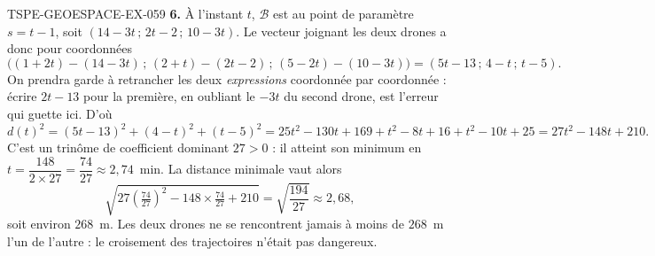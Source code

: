 \begin{corrige}{TSPE-GEOESPACE-EX-059}
\textbf{6.} À l'instant $t$, $\mathcal{B}$ est au point de paramètre $s=t-1$,
soit $(14-3t\,;\,2t-2\,;\,10-3t)$. Le vecteur joignant les deux drones a donc
pour coordonnées
\[
  \big((1+2t)-(14-3t)\,;\,(2+t)-(2t-2)\,;\,(5-2t)-(10-3t)\big)=(5t-13\,;\,4-t\,;\,t-5).
\]
On prendra garde à retrancher les deux \emph{expressions} coordonnée par
coordonnée : écrire $2t-13$ pour la première, en oubliant le $-3t$ du second
drone, est l'erreur qui guette ici. D'où
\[
  d(t)^2=(5t-13)^2+(4-t)^2+(t-5)^2
  =25t^2-130t+169+t^2-8t+16+t^2-10t+25=27t^2-148t+210.
\]
C'est un trinôme de coefficient dominant $27>0$ : il atteint son minimum en
$t=\dfrac{148}{2\times 27}=\dfrac{74}{27}\approx 2{,}74$~min. La distance
minimale vaut alors
\[
  \sqrt{27\left(\tfrac{74}{27}\right)^2-148\times\tfrac{74}{27}+210}
  =\sqrt{\dfrac{194}{27}}\approx 2{,}68,
\]
soit environ $268$~m. Les deux drones ne se rencontrent jamais à moins de
$268$~m l'un de l'autre : le croisement des trajectoires n'était pas dangereux.
\end{corrige}
